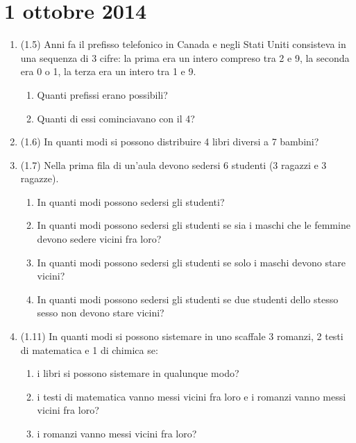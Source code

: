 \section{1 ottobre 2014}

\begin{enumerate}
    \item (1.5) Anni fa il prefisso telefonico in Canada e negli Stati Uniti consisteva in una sequenza di 3 cifre: la prima era un intero compreso tra 2 e 9, la seconda era 0 o 1, la terza era un intero tra 1 e 9. 
    \begin{enumerate}
        \item Quanti prefissi erano possibili?
        \item Quanti di essi cominciavano con il 4?
    \end{enumerate}
    \item (1.6) In quanti modi si possono distribuire 4 libri diversi a 7 bambini?
    \item (1.7) Nella prima fila di un'aula devono sedersi 6 studenti (3 ragazzi e 3 ragazze).
    \begin{enumerate}
        \item In quanti modi possono sedersi gli studenti?
        \item In quanti modi possono sedersi gli studenti se sia i maschi che le femmine devono sedere vicini fra loro?
        \item In quanti modi possono sedersi gli studenti se solo i maschi devono stare vicini?
        \item In quanti modi possono sedersi gli studenti se due studenti dello stesso sesso non devono stare vicini?
    \end{enumerate}
    \item (1.11) In quanti modi si possono sistemare in uno scaffale 3 romanzi, 2 testi di matematica e 1 di chimica se:
    \begin{enumerate}
        \item i libri si possono sistemare in qualunque modo?
        \item i testi di matematica vanno messi vicini fra loro e i romanzi vanno messi vicini fra loro?
        \item i romanzi vanno messi vicini fra loro?
    \end{enumerate}
\end{enumerate}